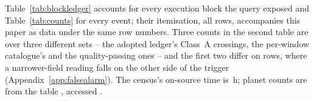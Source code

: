 \begin{table}
\centering
\scriptsize
\caption{\textbf{The survey ledger, part one: execution blocks and windows.}
Each row carries its own number, and a group sums to the row whose number
heads it. Hours are window-hours, so the classes partition the hours as they
partition the windows. Rows~3.2 to 3.5 are the archival gap, over which no
result is formed.}
\label{tab:blockledger}

\end{table}

Table~\ref{tab:blockledger} accounts for every execution block the query
exposed and Table~\ref{tab:counts} for every event; their itemisation, all
\MtCountRows{} rows, accompanies this paper as data under the same row
numbers. Three counts in the second table are \MtCrossA{} over three different
sets -- the adopted ledger's Class~A crossings, the per-window catalogue's and
the quality-passing ones -- and the first two differ on \FrNFlag{} rows, where
a narrower-field reading falls on the other side of the trigger
(Appendix~\ref{app:falsealarm}). The census's on-source time is
\StTelHours\,h; planet counts are from the \SfHostCatalogue{} \SfHostTable{}
table \citep{NEA2013}, accessed \SfHostDate.

\begin{table}
\centering
\scriptsize
\caption{\textbf{The survey ledger, part two: events, dispositions and
confirmation.} Every headline count is read from here; rows 2.2--2.4
define each unattributed set.}
\label{tab:counts}

\end{table}

